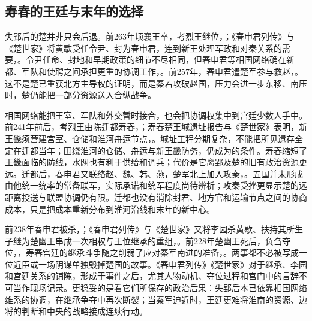 \subsection{寿春的王廷与末年的选择}

失郢后的楚并非只会后退。前263年顷襄王卒，考烈王继位，；《春申君列传》与《楚世家》将黄歇受任令尹、封为春申君，连到新王处理军政和对秦关系的需要，。令尹任命、封地和早期政策的细节不尽相同，但春申君等相国网络确在新都、军队和使聘之间承担更重的协调工作，。前257年，春申君遣楚军参与救赵，。这不是楚已重获北方主导权的证明，而是秦若攻破赵国，压力会进一步东移、南压时，楚仍能把一部分资源送入合纵战争。

相国网络能把王室、军队和外交暂时接合，也会把协调权集中到宫廷少数人手中。前241年前后，考烈王由陈迁都寿春，；寿春楚王城遗址报告与《楚世家》表明，新王畿须营建宫室、仓储和淮河舟运节点，。城址工程分期复杂，不能把所见遗存全定在迁都当年；围绕淮河的仓储、舟运与新王畿防务，仍成为的条件。寿春缩短了王畿面临的防线，水网也有利于供给和调兵；代价是它离郢及楚的旧有政治资源更远。迁都后，春申君又联络赵、魏、韩、燕，楚军北上加入攻秦，。五国并未形成由他统一统率的常备联军，实际承诺和统军程度尚待辨析；攻秦受挫更显示楚的远距离投送与联盟协调仍有限。迁都也没有消除封君、地方官和运输节点之间的协商成本，只是把成本重新分布到淮河沿线和末年的新中心。

前238年春申君被杀，；《春申君列传》与《楚世家》又将李园杀黄歇、扶持其所生子继为楚幽王串成一次相权与王位继承的重组，。前228年楚幽王死后，负刍夺位，，寿春宫廷的继承斗争随之削弱了应对秦军南进的准备，。两事都不必被写成一位近臣或一场阴谋单独毁掉楚国的故事。《春申君列传》《楚世家》对于继承、李园和宫廷关系的铺陈，形成于事件之后，尤其人物动机、夺位过程和宫门中的言辞不可当作现场记录。更稳妥的是看它们所保存的政治后果：失郢后本已依靠相国网络维系的协调，在继承争夺中再次断裂；当秦军迫近时，王廷更难将淮南的资源、边将的判断和中央的战略接成连续行动。

